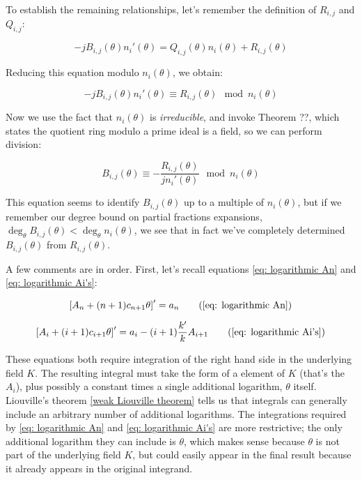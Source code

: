 To establish the remaining relationships, let's remember the definition of
$R_{i,j}$ and $Q_{i,j}$:

$$-j B_{i,j}(\theta)n_i'(\theta) = Q_{i,j}(\theta) n_i(\theta) + R_{i,j}(\theta)$$

Reducing this equation modulo $n_i(\theta)$, we obtain:

$$-j B_{i,j}(\theta)n_i'(\theta) \equiv R_{i,j}(\theta) \mod n_i(\theta)$$

Now we use the fact that $n_i(\theta)$ is {\it irreducible},
and invoke Theorem ??, which states the quotient ring
modulo a prime ideal is a field, so we can perform division:

$$ B_{i,j}(\theta) \equiv - \frac{R_{i,j}(\theta)}{jn_i'(\theta)} \mod n_i(\theta)$$

This equation seems to identify $B_{i,j}(\theta)$ up to a multiple of $n_i(\theta)$,
but if we remember our degree bound on partial fractions expansions,
$\deg_\theta B_{i,j}(\theta) < \deg_\theta n_i(\theta)$, we see
that in fact we've completely determined $B_{i,j}(\theta)$ from
$R_{i,j}(\theta)$.

\endtheorem

A few comments are in order.  First, let's recall equations
\eqref{eq: logarithmic An} and \eqref{eq: logarithmic Ai's}:

\begin{equation}
\left[ A_n + (n+1) c_{n+1} \theta \right]' = a_n
\tag{\ref{eq: logarithmic An}}
\end{equation}

\begin{equation}
\left[ A_i + (i+1) c_{i+1} \theta \right]' = a_i - (i+1) \frac{k'}{k} A_{i+1}
\tag{\ref{eq: logarithmic Ai's}}
\end{equation}

These equations both require integration of the right hand side in the
underlying field $K$.  The resulting integral must take the form of a
element of $K$ (that's the $A_i$), plus possibly a constant times a
single additional logarithm, $\theta$ itself.  Liouville's
theorem \ref{weak Liouville theorem} tells us that integrals can
generally include an arbitrary number of additional logarithms.  The
integrations required by
\eqref{eq: logarithmic An} and \eqref{eq: logarithmic Ai's}
are more restrictive; the only additional logarithm they can include
is $\theta$, which makes sense because $\theta$ is not part of the
underlying field $K$, but could easily appear in the final result
because it already appears in the original integrand.

